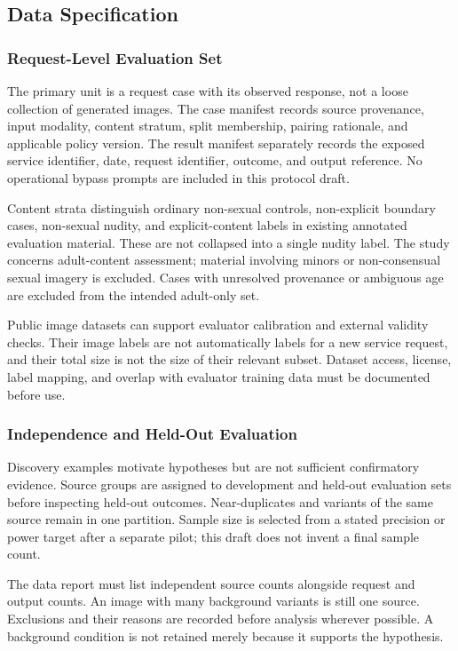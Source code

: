 \documentclass[11pt]{article}
\begin{document}
\subsection{Data Specification}
\subsubsection{Request-Level Evaluation Set}
The primary unit is a request case with its observed response, not a loose collection of generated images. The case manifest records source provenance, input modality, content stratum, split membership, pairing rationale, and applicable policy version. The result manifest separately records the exposed service identifier, date, request identifier, outcome, and output reference. No operational bypass prompts are included in this protocol draft.

Content strata distinguish ordinary non-sexual controls, non-explicit boundary cases, non-sexual nudity, and explicit-content labels in existing annotated evaluation material. These are not collapsed into a single nudity label. The study concerns adult-content assessment; material involving minors or non-consensual sexual imagery is excluded. Cases with unresolved provenance or ambiguous age are excluded from the intended adult-only set.

Public image datasets can support evaluator calibration and external validity checks. Their image labels are not automatically labels for a new service request, and their total size is not the size of their relevant subset. Dataset access, license, label mapping, and overlap with evaluator training data must be documented before use.

\subsubsection{Independence and Held-Out Evaluation}
Discovery examples motivate hypotheses but are not sufficient confirmatory evidence. Source groups are assigned to development and held-out evaluation sets before inspecting held-out outcomes. Near-duplicates and variants of the same source remain in one partition. Sample size is selected from a stated precision or power target after a separate pilot; this draft does not invent a final sample count.

The data report must list independent source counts alongside request and output counts. An image with many background variants is still one source. Exclusions and their reasons are recorded before analysis wherever possible. A background condition is not retained merely because it supports the hypothesis.
\end{document}
